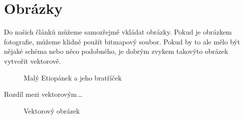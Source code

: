 \documentclass[a4paper, 11pt]{article}
\begin{document}
\section{Obrázky}
Do našich článků můžeme samozřejmě vkládat obrázky. Pokud je obrázkem fotografie, můžeme klidně použít bitmapový soubor. Pokud by to ale mělo být nějaké schéma nebo něco podobného, je dobrým zvykem takovýto obrázek vytvořit vektorově.
\begin{figure}[h]
    \centering
    \caption{Malý Etiopánek a jeho bratříček}
    \label{fig:1}
\end{figure}

\clearpage
Rozdíl mezi vektorovým\,\dots
\begin{figure}[h]
    \centering
    \caption{Vektorový obrázek}
    \label{fig:2}
\end{figure}
\bigskip
\\\
\end{document}
